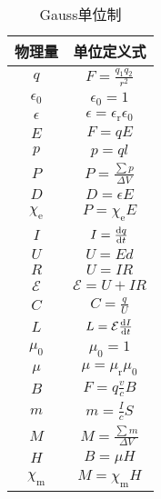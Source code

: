 \begin{table}[htbp]
    \centering
    \begin{tabular}{|c|c|}
        \hline
        物理量 & 单位定义式\\
        \hline
        \hline
        $q$ & $F=\frac{q_1q_2}{r^2}$\\
        \hline
        \hline
        $\epsilon_0$ & $\epsilon_0=1$\\
        \hline
        $\epsilon$ & $\epsilon=\epsilon_\text{r}\epsilon_0$\\
        \hline
        $E$ & $F=qE$\\
        \hline
        $p$ & $p=ql$\\
        \hline
        $P$ & $P=\frac{\sum p}{\Delta V}$\\
        \hline
        $D$ & $D=\epsilon E$\\
        \hline
        $\chi_\text{e}$ & $P=\chi_\text{e}E$\\
        \hline
        \hline
        $I$ & $I=\frac{\mathrm{d} q}{\mathrm{d} t}$\\
        \hline
        $U$ & $U=Ed$\\
        \hline
        $R$ & $U=IR$\\
        \hline
        $\mathcal{E}$ & $\mathcal{E}=U+IR$\\
        \hline
        $C$ & $C=\frac{q}{U}$\\
        \hline
        $L$ & $L=\mathcal{E}\frac{\mathrm{d} I}{\mathrm{d} t}$\\
        \hline
        \hline
        $\mu_0$ & $\mu_0=1$\\
        \hline
        $\mu$ & $\mu=\mu_\text{r}\mu_0$\\
        \hline
        $B$ & $F=q\frac{v}{c}B$\\
        \hline
        $m$ & $m=\frac{I}{c}S$\\
        \hline
        $M$ & $M=\frac{\sum m}{\Delta V}$\\
        \hline
        $H$ & $B=\mu H$\\
        \hline
        $\chi_\text{m}$ & $M=\chi_\text{m}H$\\
        \hline
    \end{tabular}
    \caption{Gauss单位制}
\end{table}
